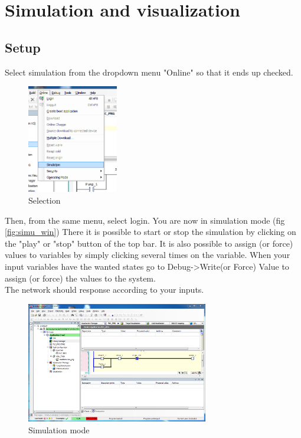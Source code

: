 \documentclass[10pt,a4paper]{article}
\begin{document}
\section{Simulation and visualization}
\subsection{Setup}
Select simulation from the dropdown menu "Online" so that it ends up checked.

\begin{figure}[h!]
	\begin{center}
		\includegraphics[width=150px]{img9.png}
	\end{center}
\caption{Selection}
\label{fig:simu}
\end{figure}

Then, from the same menu, select login. You are now in simulation mode (fig \vref{fig:simu_win})
There it is possible to start or stop the simulation by clicking on the "play" or "stop" button of the top bar.
It is also possible to assign (or force) values to variables by simply clicking several times on the variable. When your input variables have the wanted states go to Debug->Write(or Force) Value to assign (or force) the values to the system.\\
The network should response according to your inputs.

\begin{figure}[h!]
	\begin{center}
		\includegraphics[width=300px]{img10.PNG}
	\end{center}
\caption{Simulation mode}
\label{fig:simu_win}
\end{figure}
\end{document}
